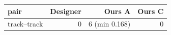 \begin{tabular}{lrrr}
\toprule
pair & Designer & Ours A & Ours C \\
\midrule
track--track & 0 & 6 (min 0.168) & 0 \\
\bottomrule
\end{tabular}
